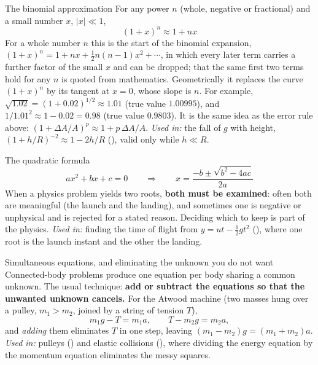 \begin{defbox}{The binomial approximation}
For any power $n$ (whole, negative or fractional) and a small number $x$, $|x|\ll1$,
\[
\boxed{\;(1+x)^{n}\approx1+nx\;}
\]
For a whole number $n$ this is the start of the binomial expansion,
$(1+x)^{n}=1+nx+\tfrac12n(n-1)x^{2}+\cdots$, in which every later term carries a further factor of the
small $x$ and can be dropped; that the same first two terms hold for any $n$ is quoted from mathematics.
Geometrically it replaces the curve $(1+x)^{n}$ by its tangent at $x=0$, whose slope is $n$. For example,
$\sqrt{1.02}=(1+0.02)^{1/2}\approx1.01$ (true value $1.00995$), and $1/1.01^{2}\approx1-0.02=0.98$ (true
value $0.9803$). It is the same idea as the error rule above: $(1+\Delta A/A)^{p}\approx1+p\,\Delta A/A$.
\emph{Used in:} the fall of $g$ with height, $(1+h/R)^{-2}\approx1-2h/R$ (),
valid only while $h\ll R$.
\end{defbox}

\begin{keybox}{The quadratic formula}
\[
ax^{2}+bx+c=0\qquad\Longrightarrow\qquad x=\frac{-b\pm\sqrt{b^{2}-4ac}}{2a}
\]
When a physics problem yields two roots, \textbf{both must be examined}: often both are meaningful
(the launch and the landing), and sometimes one is negative or unphysical and is rejected for a stated
reason. Deciding which to keep is part of the physics. \emph{Used in:} finding the time of flight from
$y=ut-\tfrac12gt^{2}$ (), where one root is the launch instant and the other the landing.
\end{keybox}

\begin{methodbox}{Simultaneous equations, and eliminating the unknown you do not want}
Connected-body problems produce one equation per body sharing a common unknown. The usual technique:
\textbf{add or subtract the equations so that the unwanted unknown cancels.} For the Atwood machine
(two masses hung over a pulley, $m_1>m_2$, joined by a string of tension $T$),
\[
m_1g-T=m_1a,\qquad T-m_2g=m_2a,
\]
and \emph{adding} them eliminates $T$ in one step, leaving $(m_1-m_2)g=(m_1+m_2)a$. \emph{Used in:} pulleys
() and elastic collisions (), where dividing the energy equation by the momentum equation
eliminates the messy squares.
\end{methodbox}

